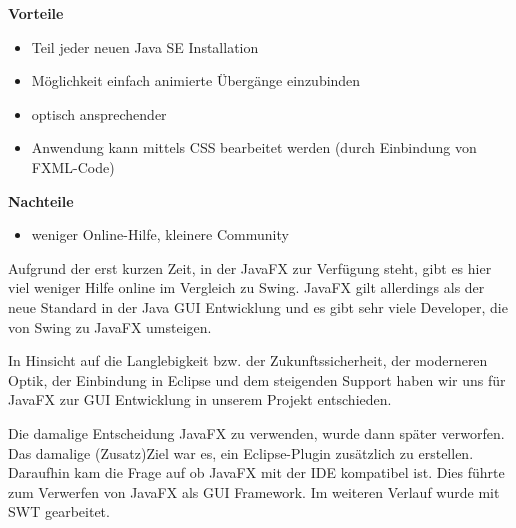 
\textbf{Vorteile}
\begin{itemize}
	\item Teil jeder neuen Java SE Installation
	\item Möglichkeit einfach animierte Übergänge einzubinden
	\item optisch ansprechender
	\item Anwendung kann mittels CSS bearbeitet werden (durch Einbindung von FXML-Code)
\end{itemize}


\textbf{Nachteile}
\begin{itemize}
	\item weniger Online-Hilfe, kleinere Community
\end{itemize}


Aufgrund der erst kurzen Zeit, in der JavaFX zur Verfügung steht, gibt es hier viel weniger Hilfe online im Vergleich zu Swing. JavaFX gilt allerdings als der neue Standard in der Java GUI Entwicklung und es gibt sehr viele Developer, die von Swing zu JavaFX umsteigen.

\nsecend %

\nsecend %


In Hinsicht auf die Langlebigkeit bzw. der Zukunftssicherheit, der moderneren Optik, der Einbindung in Eclipse und dem steigenden Support haben wir uns für JavaFX zur GUI Entwicklung in unserem Projekt entschieden.

\nsecend %

Die damalige Entscheidung JavaFX zu verwenden, wurde dann später verworfen. Das damalige (Zusatz)Ziel war es, ein Eclipse-Plugin zusätzlich zu erstellen. Daraufhin kam die Frage auf ob JavaFX mit der IDE kompatibel ist. Dies führte zum Verwerfen von JavaFX als GUI Framework. Im weiteren Verlauf wurde mit SWT gearbeitet.
\nsecend %
\nsecend %